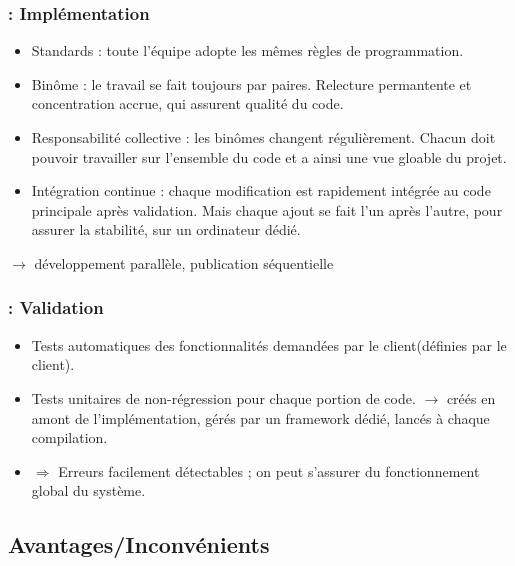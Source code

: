 \begin{frame}
\frametitle{\insertsubsection : Implémentation}
\begin{itemize}
\item Standards : toute l'équipe adopte les mêmes règles de programmation.
\item Binôme : le travail se fait toujours par paires. Relecture permantente et concentration accrue, qui assurent qualité du code.
\item Responsabilité collective : les binômes changent régulièrement. Chacun doit pouvoir travailler sur l'ensemble du code et a ainsi une vue gloable du projet.
\item Intégration continue : chaque modification est rapidement intégrée au code principale après validation. Mais chaque ajout se fait l'un après l'autre, pour assurer la stabilité, sur un ordinateur dédié.
\end{itemize}

\begin{center}
$\longrightarrow$  développement parallèle, publication séquentielle 
\end{center}
\end{frame}

\begin{frame}
\frametitle{\insertsubsection : Validation}
\begin{itemize}
\item Tests automatiques des fonctionnalités demandées par le client(définies par le client).
\item Tests unitaires de non-régression pour chaque portion de code.
$\longrightarrow$ créés en amont de l'implémentation, gérés par un framework dédié, lancés à chaque compilation.
\item $\Rightarrow$ Erreurs facilement détectables ; on peut s'assurer du fonctionnement global du système.
\end{itemize}
\end{frame}

\subsection{Avantages/Inconvénients}
\begin{frame}
\frametitle{\insertsubsection}
\end{frame}

